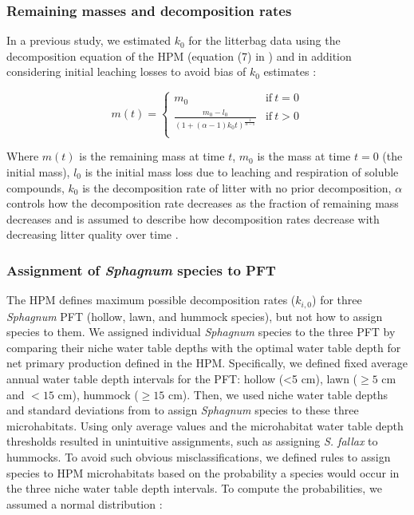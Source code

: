 \documentclass[esd, manuscript]{copernicus}
\begin{document}
\hypertarget{sdm-003-methods-3}{%
\subsubsection{Remaining masses and decomposition rates}\label{sdm-003-methods-3}}

In a previous study, we estimated \(k_0\) for the litterbag data using the decomposition equation of the HPM (equation (7) in \citet{Frolking.2010}) and in addition considering initial leaching losses to avoid bias of \(k_0\) estimates \citep{Teickner.2024f}:

\begin{equation}
m(t) = \begin{cases}
m_0 & \mathrm{if}~t=0\\
\frac{m_0 - l_0}{(1 + (\alpha - 1) k_0 t)^{\frac{1}{\alpha - 1}}} & \mathrm{if}~t>0\\
\end{cases}
\label{eq:decomposition-solution-2-with-leaching-1}
\end{equation}

Where \(m(t)\) is the remaining mass at time \(t\), \(m_0\) is the mass at time \(t=0\) (the initial mass), \(l_0\) is the initial mass loss due to leaching and respiration of soluble compounds, \(k_0\) is the decomposition rate of litter with no prior decomposition, \(\alpha\) controls how the decomposition rate decreases as the fraction of remaining mass decreases and is assumed to describe how decomposition rates decrease with decreasing litter quality over time \citep{Frolking.2001}.

\hypertarget{sdm-003-methods-4}{%
\subsubsection{\texorpdfstring{Assignment of \emph{Sphagnum} species to PFT}{Assignment of Sphagnum species to PFT}}\label{sdm-003-methods-4}}

The HPM defines maximum possible decomposition rates (\(k_{i,0}\)) for three \emph{Sphagnum} PFT (hollow, lawn, and hummock species), but not how to assign species to them. We assigned individual \emph{Sphagnum} species to the three PFT by comparing their niche water table depths with the optimal water table depth for net primary production defined in the HPM. Specifically, we defined fixed average annual water table depth intervals for the PFT: hollow (\textless5 cm), lawn (\(\ge5\) cm and \(<15\) cm), hummock (\(\ge15\) cm). Then, we used niche water table depths and standard deviations from \citet{Johnson.2015} to assign \emph{Sphagnum} species to these three microhabitats. Using only average values and the microhabitat water table depth thresholds resulted in unintuitive assignments, such as assigning \emph{S. fallax} to hummocks. To avoid such obvious misclassifications, we defined rules to assign species to HPM microhabitats based on the probability a species would occur in the three niche water table depth intervals. To compute the probabilities, we assumed a normal distribution \citep{Johnson.2015}:
\end{document}
